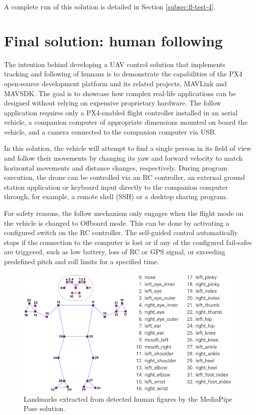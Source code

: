A complete run of this solution is detailed in Section \ref{subsec:fl-test-4}.


\section{Final solution: human following}
\label{sec:follow}

The intention behind developing a UAV control solution that implements tracking and following of humans is to demonstrate the capabilities of the PX4 open-source development platform and its related projects, MAVLink and MAVSDK. The goal is to showcase how complex real-life applications can be designed without relying on expensive proprietary hardware. The follow application requires only a PX4-enabled flight controller installed in an aerial vehicle, a companion computer of appropriate dimensions mounted on board the vehicle, and a camera connected to the companion computer via USB.

In this solution, the vehicle will attempt to find a single person in its field of view and follow their movements by changing its yaw and forward velocity to match horizontal movements and distance changes, respectively.
During program execution, the drone can be controlled via an RC controller, an external ground station application or keyboard input directly to the companion computer through, for example, a remote shell (SSH) or a desktop sharing program.

For safety reasons, the follow mechanism only engages when the flight mode on the vehicle is changed to Offboard mode. This can be done by activating a configured switch on the RC controller. The self-guided control automatically stops if the connection to the computer is lost or if any of the configured fail-safes are triggered, such as low battery, loss of RC or GPS signal, or exceeding predefined pitch and roll limits for a specified time.

\begin{figure}
  \centering
  \includegraphics[width=\textwidth, keepaspectratio]{img/pose-landmarks.png}
  \caption{Landmarks extracted from detected human figures by the MediaPipe Pose solution.}
  \label{fig:pose-landmarks}
\end{figure}

